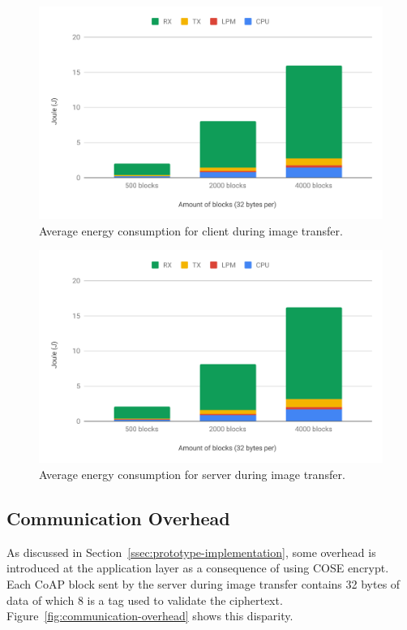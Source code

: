 \documentclass[0-thesis.tex]{subfiles}
\begin{document}
\begin{figure}[h!]
    \caption{Average energy consumption for client during image transfer.}
    \label{fig:client-image-energy}
    \includegraphics[scale=0.65]{images/client-image-energy.pdf}
\end{figure}

\begin{figure}[h!]
    \caption{Average energy consumption for server during image transfer.}
    \label{fig:server-image-energy}
    \includegraphics[scale=0.65]{images/server-image-energy.pdf}
\end{figure}

\newpage
\subsection{Communication Overhead}
\label{ssec:communication-overhead}
As discussed in Section~\ref{ssec:prototype-implementation}, some overhead is introduced
at the application layer as a consequence of using COSE encrypt. Each CoAP block sent by
the server during image transfer contains 32 bytes of data of which 8 is a tag used to
validate the ciphertext. Figure~\ref{fig:communication-overhead} shows this disparity.
\end{document}
